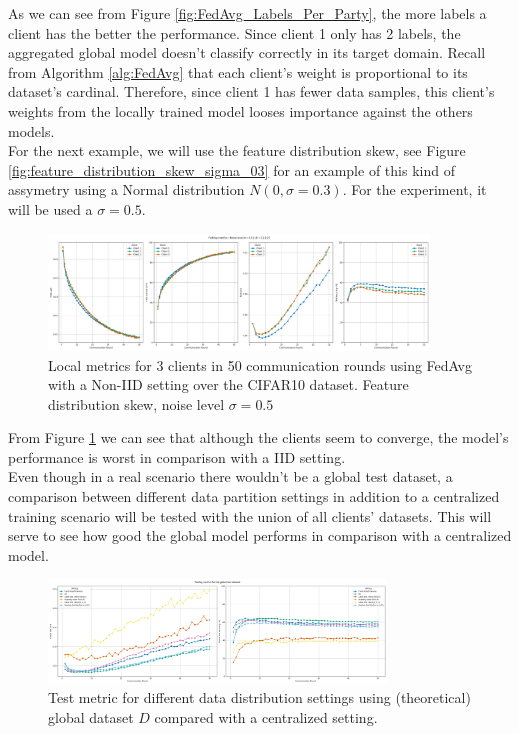 As we can see from Figure \ref{fig:FedAvg_Labels_Per_Party}, the more labels a client has the better the performance. Since client 1 only has 2 labels, the aggregated global model doesn't classify correctly in its target domain. Recall from Algorithm \ref{alg:FedAvg} that each client's weight is proportional to its dataset's cardinal. Therefore, since client 1 has fewer data samples, this client's weights from the locally trained model looses importance against the others models.\\
For the next example, we will use the feature distribution skew, see Figure \ref{fig:feature_distribution_skew_sigma_03} for an example of this kind of assymetry using a Normal distribution $N(0, \sigma= 0.3)$. For the experiment, it will be used a $\sigma=0.5$.

\begin{figure}[H]
  \centering
  \includegraphics[width=0.9\textwidth]{figures/2-Federated_Learning/FedAvg_Noise_0.5_CIFAR10.png}
  \caption{Local metrics for 3 clients in 50 communication rounds using FedAvg with a Non-IID setting over the CIFAR10 dataset. Feature distribution skew, noise level $\sigma = 0.5$}
  \label{fig:FedAvg_Noise_level}
\end{figure}

From Figure \ref{fig:FedAvg_Noise_level} we can see that although the clients seem to converge, the model's performance is worst in comparison with a IID setting.\\
Even though in a real scenario there wouldn't be a global test dataset, a comparison between different data partition settings in addition to a centralized training scenario will be tested with the union of all clients' datasets. This will serve to see how good the global model performs in comparison with a centralized model.

\begin{figure}[H]
  \centering
  \includegraphics[width=0.8\textwidth]{figures/2-Federated_Learning/FedAvg_central_metrics.png}
  \caption{Test metric for different data distribution settings using (theoretical) global dataset $D$ compared with a centralized setting.}
  \label{fig:FedAvg_Central_Metrics}
\end{figure}

